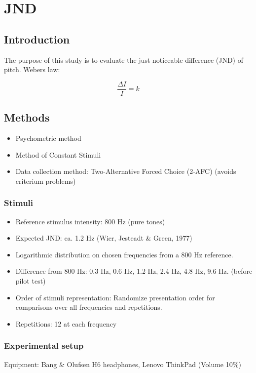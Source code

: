 \chapter*{JND}

\section*{Introduction}
The purpose of this study is to evaluate the just noticeable difference (JND) of pitch.
Webers law:

\begin{equation}
\frac{\Delta I}{I} = k
\end{equation}

\section*{Methods}
%
\begin{itemize}
  \item Psychometric method
  \item Method of Constant Stimuli
  \item Data collection method: Two-Alternative Forced Choice (2-AFC) (avoids criterium problems)
\end{itemize}


\subsection*{Stimuli}
%
\begin{itemize}
\item Reference stimulus intensity: 800 Hz (pure tones)
\item Expected JND: ca. 1.2 Hz (Wier, Jesteadt \& Green, 1977)
\item Logarithmic distribution on chosen frequencies from a 800 Hz reference.
\item Difference from 800 Hz: 0.3 Hz, 0.6 Hz, 1.2 Hz, 2.4 Hz, 4.8 Hz, 9.6 Hz. (before pilot test)
\item Order of stimuli representation: Randomize presentation order for comparisons over all frequencies and repetitions.
\item Repetitions: 12 at each frequency 
\end{itemize}


\subsection*{Experimental setup}
Equipment: Bang \& Olufsen H6 headphones, Lenovo ThinkPad (Volume 10\%)

